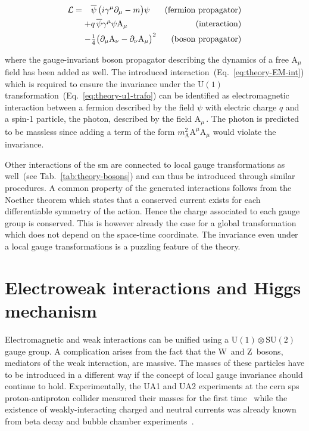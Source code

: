 \begin{subequations}
\begin{align}
\mathcal{L}=\hphantom{+}&\bar{\psi}\,\big(i\gamma^\mu\partial_\mu-m\big)\psi &(\mathrm{fermion~propagator}) \\
            +&q\,\bar{\psi}\gamma^{\mu}\psi \mathrm{A}_{\mu} &(\mathrm{interaction}) \label{eq:theory-EM-int}\\
            -&\tfrac{1}{4}\big(\partial_\mu \mathrm{A}_\nu-\partial_\nu \mathrm{A}_\mu\big)^{2} &(\mathrm{boson~propagator})
\end{align}
\end{subequations}

where the gauge-invariant boson propagator describing the dynamics of a free $\mathrm{A}_\mu$ field has been added as well. The introduced interaction~(Eq.~\ref{eq:theory-EM-int}) which is required to ensure the invariance under the $\mathrm{U(1)}$ transformation~(Eq.~\ref{eq:theory-u1-trafo}) can be identified as electromagnetic interaction between a fermion described by the field $\psi$ with electric charge $q$ and a spin-1 particle, the photon, described by the field $\mathrm{A}_\mu$\,. The photon is predicted to be massless since adding a term of the form $m^{2}_\mathrm{A}\mathrm{A}^\mu \mathrm{A}_\mu$ would violate the invariance.

Other interactions of the \gls{sm} are connected to local gauge transformations as well~(see Tab.~\ref{tab:theory-bosons}) and can thus be introduced through similar procedures. A common property of the generated interactions follows from the Noether theorem which states that a conserved current exists for each differentiable symmetry of the action. Hence the charge associated to each gauge group is conserved. This is however already the case for a global transformation which does not depend on the space-time coordinate. The invariance even under a local gauge transformations is a puzzling feature of the theory.



\section{Electroweak interactions and Higgs mechanism}
\label{sec:theory-ewk}

Electromagnetic and weak interactions can be unified using a $\mathrm{U(1)}\otimes \mathrm{SU(2)}$ gauge group. A complication arises from the fact that the $\mathrm{W}$~and $\mathrm{Z}$~bosons, mediators of the weak interaction, are massive. The masses of these particles have to be introduced in a different way if the concept of local gauge invariance should continue to hold. Experimentally, the UA1 and UA2 experiments at the \gls{cern} \gls{sps} proton-antiproton collider measured their masses for the first time~\cite{Arnison:1983rp,Banner:1983jy,Arnison:1983mk,Bagnaia:1983zx} while the existence of weakly-interacting charged and neutral currents was already known from beta decay and bubble chamber experiments~\cite{Hasert:1973ff}.

